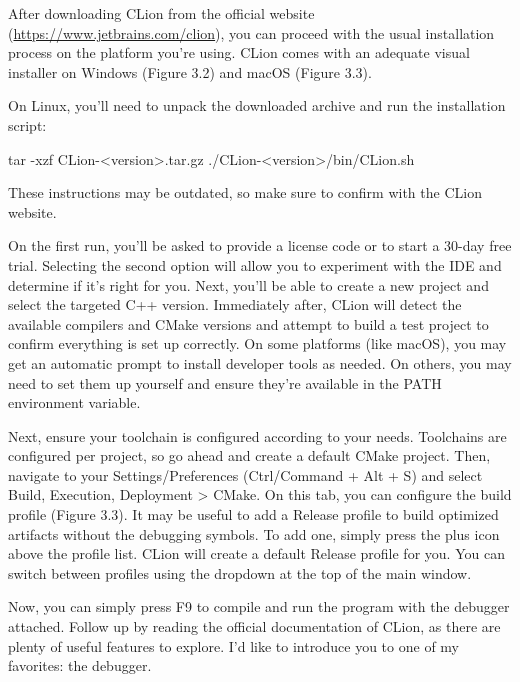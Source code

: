 After downloading CLion from the official website (\url{https://www.jetbrains.com/clion}), you can proceed with the usual installation process on the platform you’re using. CLion comes with an adequate visual installer on Windows (Figure 3.2) and macOS (Figure 3.3).



On Linux, you’ll need to unpack the downloaded archive and run the installation script:

\begin{shell}
tar -xzf CLion-<version>.tar.gz
./CLion-<version>/bin/CLion.sh
\end{shell}

These instructions may be outdated, so make sure to confirm with the CLion website.

On the first run, you’ll be asked to provide a license code or to start a 30-day free trial. Selecting the second option will allow you to experiment with the IDE and determine if it’s right for you. Next, you’ll be able to create a new project and select the targeted C++ version. Immediately after, CLion will detect the available compilers and CMake versions and attempt to build a test project to confirm everything is set up correctly. On some platforms (like macOS), you may get an automatic prompt to install developer tools as needed. On others, you may need to set them up yourself and ensure they’re available in the PATH environment variable.

Next, ensure your toolchain is configured according to your needs. Toolchains are configured per project, so go ahead and create a default CMake project. Then, navigate to your Settings/Preferences (Ctrl/Command + Alt + S) and select Build, Execution, Deployment > CMake. On this tab, you can configure the build profile (Figure 3.3). It may be useful to add a Release profile to build optimized artifacts without the debugging symbols. To add one, simply press the plus icon above the profile list. CLion will create a default Release profile for you. You can switch between profiles using the dropdown at the top of the main window.

Now, you can simply press F9 to compile and run the program with the debugger attached. Follow up by reading the official documentation of CLion, as there are plenty of useful features to explore. I’d like to introduce you to one of my favorites: the debugger.

